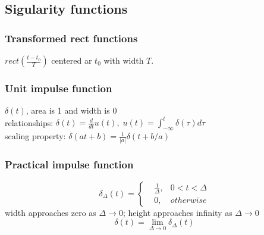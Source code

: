 \documentclass{article}
\theoremstyle{definition}
\begin{document}
\subsection{Sigularity functions}
\subsubsection{Transformed rect functions}
$ rect(\frac{t-t_0}{T}) $ centered ar $ t_0 $ with width $ T $.
\subsubsection{Unit impulse function}
$ \delta(t) $, area is 1 and width  is 0\\
relationships: $ \delta(t)=\frac{d}{dt} u(t),\; u(t)=\int_{-\infty}^t \delta(\tau)d\tau $\\
scaling property: $ \delta(at+b) = \frac{1}{|a|}\delta(t+b/a)$
\subsubsection{Practical impulse function}
\begin{equation}   
    \delta_\Delta (t) = \left \{ 
        \begin{aligned}
            & \frac{1}{\Delta}, & 0<t<\Delta \\
            & 0, & otherwise
        \end{aligned}
        \right.  
\end{equation}
width approaches zero as $ \Delta \rightarrow 0 $; height approaches infinity as $\Delta \rightarrow 0 $
\begin{equation}
    \delta (t)=\lim_{\Delta \to 0} \delta_\Delta (t)
\end{equation}
\end{document}
